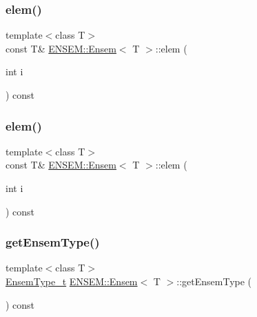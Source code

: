 \mbox{\label{classENSEM_1_1Ensem_a03e45aba3d9addb16e117debbc4e1a33}} 
\subsubsection{\texorpdfstring{elem()}{elem()}\hspace{0.1cm}{\footnotesize\ttfamily [3/4]}}
{\footnotesize\ttfamily template$<$class T$>$ \\
const T\& \mbox{\hyperlink{classENSEM_1_1Ensem}{E\+N\+S\+E\+M\+::\+Ensem}}$<$ T $>$\+::elem (\begin{DoxyParamCaption}\item[{int}]{i }\end{DoxyParamCaption}) const\hspace{0.3cm}{\ttfamily [inline]}}

\mbox{\label{classENSEM_1_1Ensem_a03e45aba3d9addb16e117debbc4e1a33}} 
\subsubsection{\texorpdfstring{elem()}{elem()}\hspace{0.1cm}{\footnotesize\ttfamily [4/4]}}
{\footnotesize\ttfamily template$<$class T$>$ \\
const T\& \mbox{\hyperlink{classENSEM_1_1Ensem}{E\+N\+S\+E\+M\+::\+Ensem}}$<$ T $>$\+::elem (\begin{DoxyParamCaption}\item[{int}]{i }\end{DoxyParamCaption}) const\hspace{0.3cm}{\ttfamily [inline]}}

\mbox{\label{classENSEM_1_1Ensem_aa2cfc665852c06f9b058a1a2233d249e}} 
\subsubsection{\texorpdfstring{getEnsemType()}{getEnsemType()}\hspace{0.1cm}{\footnotesize\ttfamily [1/2]}}
{\footnotesize\ttfamily template$<$class T$>$ \\
\mbox{\hyperlink{namespaceENSEM_a2dc2c4a26884f343471e52f23479ddbe}{Ensem\+Type\+\_\+t}} \mbox{\hyperlink{classENSEM_1_1Ensem}{E\+N\+S\+E\+M\+::\+Ensem}}$<$ T $>$\+::get\+Ensem\+Type (\begin{DoxyParamCaption}{ }\end{DoxyParamCaption}) const\hspace{0.3cm}{\ttfamily [inline]}}



